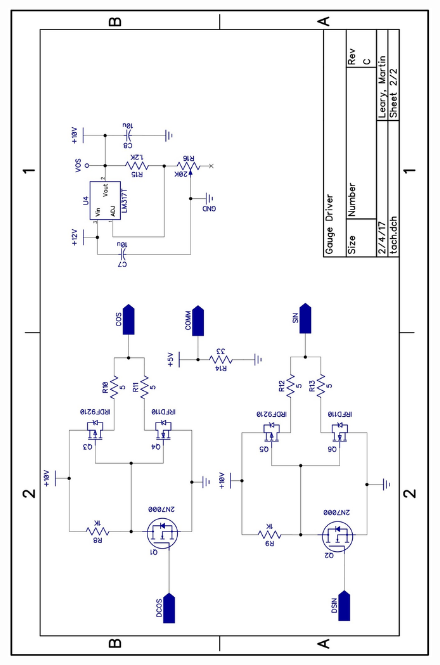 \documentclass[11pt]{article}
\begin{document}
\begin{figure}[H]
    \centering
    \includegraphics[width=.95\textwidth]{documents/tach_schem2}
\end{figure}

\newpage\clearpage
\end{document}
